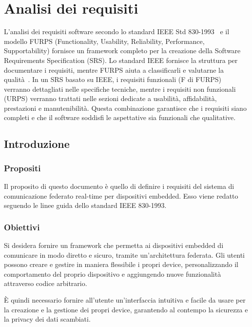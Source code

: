 \chapter{Analisi dei requisiti}

L'analisi dei requisiti software secondo lo standard IEEE Std 830-1993~\cite{iee_std} e il modello FURPS
(Functionality, Usability, Reliability, Performance, Supportability) fornisce un framework 
completo per la creazione della Software Requirements Specification (SRS).
Lo standard IEEE fornisce la struttura per documentare i requisiti, mentre FURPS aiuta 
a classificarli e valutarne la qualità~\cite{fischer1989comparing}. In un SRS basato su IEEE, i requisiti funzionali (F di FURPS) verranno 
dettagliati nelle specifiche tecniche, mentre i requisiti non funzionali (URPS) verranno 
trattati nelle sezioni dedicate a usabilità, affidabilità, prestazioni e manutenibilità.
Questa combinazione garantisce che i requisiti siano completi e che il software soddisfi 
le aspettative sia funzionali che qualitative.

\section{Introduzione}

\subsection{Propositi}

Il proposito di questo documento è quello di definire i requisiti del 
sistema di comunicazione federato real-time per dispositivi embedded.
Esso viene redatto seguendo le linee guida dello standard IEEE 830-1993.

\subsection{Obiettivi}

Si desidera fornire un framework che permetta ai dispositivi embedded di comunicare
in modo diretto e sicuro, tramite un'architettura federata. Gli utenti 
possono creare e gestire in maniera flessibile i propri device, personalizzando
il comportamento del proprio dispositivo e aggiungendo nuove funzionalità 
attraverso codice arbitrario.

È quindi necessario fornire all'utente un'interfaccia intuitiva e facile da usare
per la creazione e la gestione dei propri device, garantendo al contempo la sicurezza
e la privacy dei dati scambiati.

